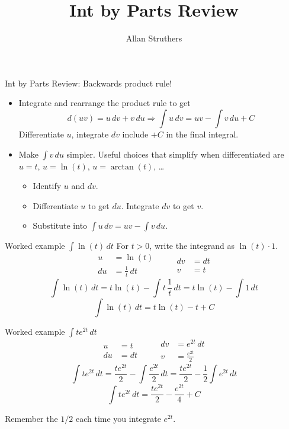 \documentclass[14pt,aspectratio=169]{beamer}
\author{Allan Struthers}
\institute{Math Sciences}
\title{Int by Parts Review}
\date{}
\begin{document}
\begin{frame}{Int by Parts Review: Backwards product rule!}
\begin{itemize}
\item Integrate and rearrange the  product rule to get
\[
d(uv)=u\,dv+v\,du 
\Longrightarrow
\boxed{\int u\,dv=uv-\int v\,du} + C
\]
Differentiate $u$, integrate $dv$ include $+C$ in the final integral.
\item Make $\int v\,du$ simpler. Useful choices 
that simplify when differentiated are $u=t$, $u=\ln(t)$, $u=\arctan(t)$, \dots

\begin{itemize}
\item Identify $u$ and $dv$.
\item Differentiate $u$ to get $du$. Integrate $dv$ to get $v$.
\item Substitute into $\int u\,dv=uv-\int v\,du$.
\end{itemize}
\end{itemize}
\end{frame}

\begin{frame}{Worked example \quad $\displaystyle\int \ln(t)\,dt$}
For $t>0$, write the integrand as $\ln(t)\cdot 1$.
\[
\boxed{\begin{aligned}
u&=\ln(t)\\
du&=\frac{1}{t}\,dt
\end{aligned}}
\qquad
\boxed{\begin{aligned}
dv&=dt\\
v&=t
\end{aligned}}
\]
\[
\int\ln(t)\,dt
=t\ln(t)-\int t\,\frac{1}{t}\,dt
=t\ln(t)-\int 1\,dt
\]
\[
\boxed{\displaystyle\int\ln(t)\,dt=t\ln(t)-t+C}
\]
\end{frame}

\begin{frame}{Worked example \quad $\displaystyle\int t e^{2t}\,dt$}
	\vspace{-2ex}
\[
\boxed{\begin{aligned}
u&=t\\
du&=dt
\end{aligned}}
\qquad
\boxed{\begin{aligned}
dv&=e^{2t}\,dt\\
v&=\frac{e^{2t}}{2}
\end{aligned}}
\]
\[
\int t e^{2t}\,dt
=\frac{t e^{2t}}{2}-\int\frac{e^{2t}}{2}\,dt
=\frac{t e^{2t}}{2}-\frac{1}{2}\int e^{2t}\,dt
\]
\[
\boxed{\displaystyle\int t e^{2t}\,dt
=\frac{t e^{2t}}{2}-\frac{e^{2t}}{4}+C}
\]

Remember the $1/2$ each time you integrate $e^{2t}$.

\end{frame}
\end{document}

